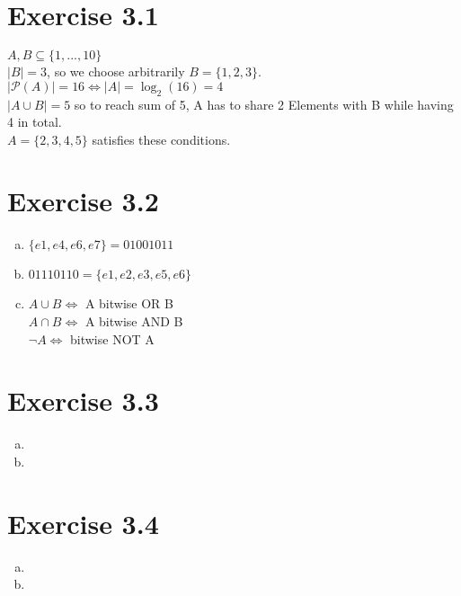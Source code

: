 \documentclass{article} %
\newcommand{\homeworkNumber}{3}
\begin{document}
\section*{Exercise \homeworkNumber.1}
$A,B \subseteq \{1,...,10\}$ \\
$\lvert B \lvert = 3$, so we choose arbitrarily $B = \{1,2,3\}$. \\
$\lvert \mathcal P(A) \lvert = 16  \iff \lvert A \lvert = \log_2(16) = 4$ \\
$\lvert A \cup B \lvert = 5$ so to reach sum of 5, A has to share 2 Elements with B while having 4 in total.\\
$A = \{2,3,4,5\}$ satisfies these conditions.




\section*{Exercise \homeworkNumber.2}

\begin{enumerate}[(a)]
	\item $\{e1,e4,e6,e7\} = 01001011$
	\item $01110110 = \{e1,e2,e3,e5,e6\}$
	\item
		$A \cup B \iff $ A bitwise OR B\\
		$A \cap B \iff $ A bitwise AND B\\
		$ \lnot A \iff $ bitwise NOT A\\


\end{enumerate}



\section*{Exercise \homeworkNumber.3}

\begin{enumerate}[(a)]
	\item
	\item
\end{enumerate}



\section*{Exercise \homeworkNumber.4}

\begin{enumerate}[(a)]
	\item
	\item
\end{enumerate}
\end{document}
